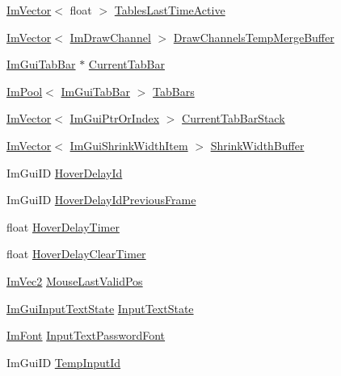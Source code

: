\begin{DoxyCompactItemize}
\item 
\hyperlink{structImVector}{Im\+Vector}$<$ float $>$ \hyperlink{structImGuiContext_aa98196e3c920ef448851d1da5922305e}{Tables\+Last\+Time\+Active}
\item 
\hyperlink{structImVector}{Im\+Vector}$<$ \hyperlink{structImDrawChannel}{Im\+Draw\+Channel} $>$ \hyperlink{structImGuiContext_abdd495b0ffbf1fd1b0a8cf7656bf4d5a}{Draw\+Channels\+Temp\+Merge\+Buffer}
\item 
\hyperlink{structImGuiTabBar}{Im\+Gui\+Tab\+Bar} $\ast$ \hyperlink{structImGuiContext_ae0289628e3d91b5e56ed46369c55ef47}{Current\+Tab\+Bar}
\item 
\hyperlink{structImPool}{Im\+Pool}$<$ \hyperlink{structImGuiTabBar}{Im\+Gui\+Tab\+Bar} $>$ \hyperlink{structImGuiContext_a8ed1e9dd2d6cf69e7aaded9a70c5c712}{Tab\+Bars}
\item 
\hyperlink{structImVector}{Im\+Vector}$<$ \hyperlink{structImGuiPtrOrIndex}{Im\+Gui\+Ptr\+Or\+Index} $>$ \hyperlink{structImGuiContext_a50e1ec3f51a0a362b770b6e4630b085c}{Current\+Tab\+Bar\+Stack}
\item 
\hyperlink{structImVector}{Im\+Vector}$<$ \hyperlink{structImGuiShrinkWidthItem}{Im\+Gui\+Shrink\+Width\+Item} $>$ \hyperlink{structImGuiContext_a835de1c6d4630fbe87831dcc1db80715}{Shrink\+Width\+Buffer}
\item 
Im\+Gui\+ID \hyperlink{structImGuiContext_a8ba7dfc669640bc79692174839fe3bae}{Hover\+Delay\+Id}
\item 
Im\+Gui\+ID \hyperlink{structImGuiContext_a773f461aa362aaf80ea16eeb6055065c}{Hover\+Delay\+Id\+Previous\+Frame}
\item 
float \hyperlink{structImGuiContext_a04dee166528789c059f18fe835f3453f}{Hover\+Delay\+Timer}
\item 
float \hyperlink{structImGuiContext_ad3aee5220720e8f293ad8dfc4ec9ed59}{Hover\+Delay\+Clear\+Timer}
\item 
\hyperlink{structImVec2}{Im\+Vec2} \hyperlink{structImGuiContext_abb075f88a3d5919045be0746a128f7fc}{Mouse\+Last\+Valid\+Pos}
\item 
\hyperlink{structImGuiInputTextState}{Im\+Gui\+Input\+Text\+State} \hyperlink{structImGuiContext_ab6f5d3daaa248a26bdbcb098d73640c1}{Input\+Text\+State}
\item 
\hyperlink{structImFont}{Im\+Font} \hyperlink{structImGuiContext_a6aa67b9b778bd741d9866ec34cc8ee8b}{Input\+Text\+Password\+Font}
\item 
Im\+Gui\+ID \hyperlink{structImGuiContext_aecd3835b2891bcdb78d14d7005daf4c0}{Temp\+Input\+Id}

\end{DoxyCompactItemize}
